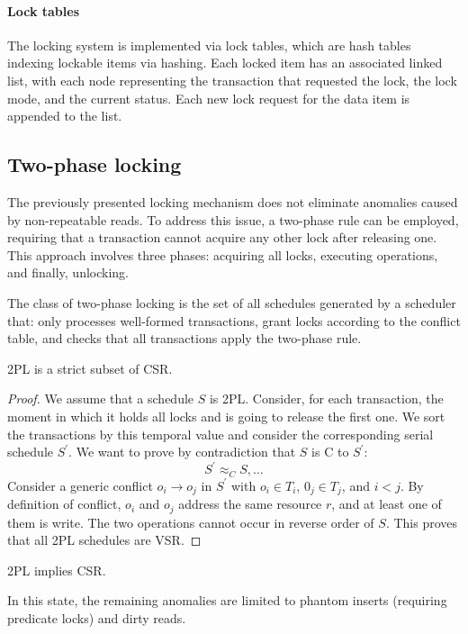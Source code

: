 \paragraph*{Lock tables}
The locking system is implemented via lock tables, which are hash tables indexing lockable items via hashing. 
Each locked item has an associated linked list, with each node representing the transaction that requested the lock, the lock mode, and the current status. 
Each new lock request for the data item is appended to the list.

\subsection{Two-phase locking}
The previously presented locking mechanism does not eliminate anomalies caused by non-repeatable reads. 
To address this issue, a two-phase rule can be employed, requiring that a transaction cannot acquire any other lock after releasing one. 
This approach involves three phases: acquiring all locks, executing operations, and finally, unlocking.
\begin{definition}
    The class of two-phase locking is the set of all schedules generated by a scheduler that: only processes well-formed transactions, grant locks according to the conflict table, and checks that all transactions apply the two-phase rule.             
\end{definition}
\begin{property}
    2PL is a strict subset of CSR. 
\end{property}
\begin{proof}
    We assume that a schedule $S$ is 2PL. Consider, for each transaction, the moment in which it holds all locks and is going to release the first one. 
    We sort the transactions by this temporal value and consider the corresponding serial schedule $S^\prime$. 
    We want to prove by contradiction that $S$ is C to $S^\prime$: 
    \[S^\prime\approx_CS,\dots\]
    Consider a generic conflict $o_i \rightarrow o_j$ in $S^\prime$ with $o_i \in T_i$, $0_j \in T_j$, and $i<j$. 
    By definition of conflict, $o_i$ and $o_j$ address the same resource $r$, and at least one of them is write. 
    The two operations cannot occur in reverse order of $S$. 
    This proves that all 2PL schedules are VSR. 
\end{proof}
\begin{property}
    2PL implies CSR.
\end{property}
In this state, the remaining anomalies are limited to phantom inserts (requiring predicate locks) and dirty reads.


